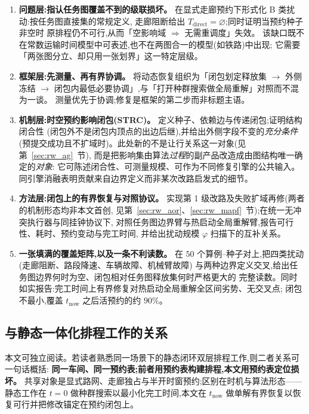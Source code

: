 \documentclass[manuscript,screen,review]{acmart}
\providecommand{\STRC}{\textsc{STRC}}
\newcommand{\ClosureAliveFrac}{90\%}
\begin{document}
\begin{enumerate}[leftmargin=1.6em,itemsep=0.4em]
\item \textbf{问题层:指认任务图覆盖不到的级联损坏。}
在显式走廊预约下形式化 B 类扰动:按任务图直接集的常规定义,
走廊阻断给出 \(T_{\mathrm{direct}}=\varnothing\);同时证明当预约种子非空时
原排程仍不可行,从而「空影响域 \(\Rightarrow\) 无需重调度」失效。
该缺口既不在常数运输时间模型中可表述,也不在两图合一的模型(如铁路)中出现;
它需要「两张图分立、却只用一张划界」这一特定层级。

\item \textbf{框架层:先测量、再有界协调。}
将动态恢复组织为「闭包划定释放集 \(\rightarrow\) 外侧冻结 \(\rightarrow\)
闭包内最低必要协调」,与「打开种群搜索做全局重解」对照而不混为一谈。
测量优先于协调;修复是框架的第二步而非标题主语。

\item \textbf{机制层:时空预约影响闭包(\STRC)。}
定义种子、依赖边与传递闭包;证明结构闭合性
(闭包外不是闭包内顶点的出边后继),并给出外侧字段不变的\emph{充分条件}
(预提交成功且不扩域时)。此处新的不是让行关系这一对象(见第~\ref{sec:rw_ag}~节),
而是把影响集由算法\emph{过程}的副产品改造成由图结构唯一确定的\emph{对象}:
它可陈述闭合性、可测量规模、可作为不同修复引擎的公共输入。
同引擎消融表明贡献来自边界定义而非某次改路启发式的细节。

\item \textbf{方法层:闭包上的有界恢复与对照协议。}
实现第 1 级改路及失败扩域再修(两者的机制形态均非本文首创,
见第~\ref{sec:rw_aor}、\ref{sec:rw_mapf}~节);在统一无冲突执行器与同挂钟协议下,
对照任务图边界臂与热启动全局重解臂,报告可行性、耗时、预约变动与完工时间,
并给出扰动规模 \(\varphi\) 扫描下的互补关系。

\item \textbf{一张填满的覆盖矩阵,以及一条不利读数。}
在 $50$ 个算例--种子对上,把四类扰动(走廊阻断、路段降速、车辆故障、机械臂故障)
与两种边界定义交叉,给出任务图边界何时为空、闭包相对任务图释放集何时严格更大的
完整读数。同时如实报告:完工时间上有界修复对热启动全局重解全区间劣势、无交叉点;
闭包不最小,覆盖 \(t_{\mathrm{now}}\) 之后活预约的约 \(\ClosureAliveFrac\)。
\end{enumerate}

\subsection{与静态一体化排程工作的关系}
\label{sec:relation_static}

本文可独立阅读。若读者熟悉同一场景下的静态闭环双层排程工作,则二者关系可一句话概括:
\textbf{同一车间、同一预约表;前者用预约表构建排程,本文用预约表定位损坏。}
共享对象是显式路网、走廊独占与半开时窗预约;区别在时机与算法形态——
静态工作在 \(t=0\) 做种群搜索以最小化完工时间,本文在 \(t_{\mathrm{now}}\)
做单解有界恢复以恢复可行并把修改锚定在预约闭包上。
\end{document}
